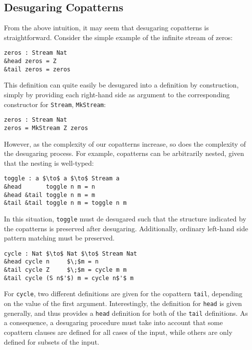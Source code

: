 \subsection{Desugaring Copatterns}
From the above intuition, it may seem that desugaring copatterns is
straightforward. Consider the simple example of the infinite stream of zeros:
\begin{lstlisting}[mathescape]
zeros : Stream Nat
&head zeros = Z
&tail zeros = zeros
\end{lstlisting}
This definition can quite easily be desugared into a definition by construction,
simply by providing each right-hand side as argument to the corresponding
constructor for \texttt{Stream}, \texttt{MkStream}:
\begin{lstlisting}[mathescape]
zeros : Stream Nat
zeros = MkStream Z zeros
\end{lstlisting}
However, as the complexity of our copatterns increase, so does the complexity of
the desugaring process. For example, copatterns can be arbitrarily nested,
given that the nesting is well-typed:
\begin{lstlisting}[mathescape]
toggle : a $\to$ a $\to$ Stream a
&head       toggle n m = n
&head &tail toggle n m = m
&tail &tail toggle n m = toggle n m
\end{lstlisting}
In this situation, \texttt{toggle} must de desugared such that the structure
indicated by the copatterns is preserved after desugaring. Additionally,
ordinary left-hand side pattern matching must be preserved.
\begin{lstlisting}[mathescape]
cycle : Nat $\to$ Nat $\to$ Stream Nat
&head cycle n     $\;$m = n
&tail cycle Z     $\;$m = cycle m m
&tail cycle (S n$'$) m = cycle n$'$ m
\end{lstlisting}
For \texttt{cycle}, two different definitions are given for the copattern
\texttt{tail}, depending on the value of the first argument. Interestingly, the
definition for \texttt{head} is given generally, and thus provides a
\texttt{head} definition for both of the \texttt{tail} definitions. As a
consequence, a desugaring procedure must take into account that some copattern
clauses are defined for all cases of the input, while others are only defined
for subsets of the input.


